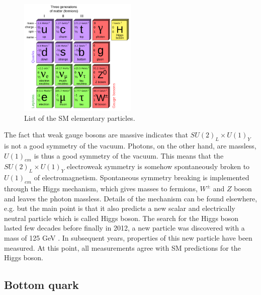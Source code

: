\begin{figure}[htbp]
	\centering
		\includegraphics[width=0.5\textwidth]{Figures/Elementary_Particles.png}
	\caption[List of Standard model elementary particles]{List of the SM elementary particles.}
	\label{fig:SM_particles}
\end{figure} 
\par The fact that weak gauge bosons are massive indicates that $SU(2)_L \times U(1)_Y$ is not a good symmetry of the vacuum. Photons, on the other hand, are massless, $U(1)_{em}$ is thus a good symmetry of the vacuum. This means that the $SU(2)_L \times U(1)_Y$ electroweak symmetry is somehow spontaneously broken to $U(1)_{em}$ of electromagnetism. Spontaneous symmetry breaking is implemented through the Higgs mechanism, which gives masses to fermions, $W^{\pm}$ and $Z$ boson and leaves the photon massless. Details of the mechanism can be found elsewhere, e.g. \cite{Griffiths:1987tj} but the main point is that it also predicts a new scalar and electrically neutral particle which is called Higgs boson. The search for the Higgs boson lasted few decades before finally in 2012, a new particle was discovered with a mass of 125 GeV \cite{Aad:2012tfa,Chatrchyan:2012ufa}. In subsequent years, properties of this new particle have been measured. At this point, all measurements agree with SM predictions for the Higgs boson.    
   


\subsection{Bottom quark}

